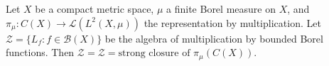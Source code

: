 Let $X$ be a compact metric space, $\mu$ a finite Borel measure on $X$, and $\pi_\mu: C(X) \to \mathcal{L}(L^2(X,\mu))$ the representation by multiplication. Let $\mathcal{Z} = \{L_f : f \in \mathcal{B}(X)\}$ be the algebra of multiplication by bounded Borel functions. Then $\mathcal{Z} = \mathcal{Z} = \text{strong closure of } \pi_\mu(C(X))$.
